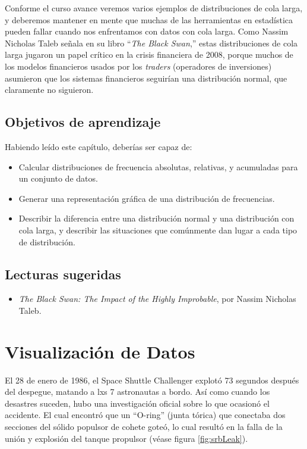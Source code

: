 \documentclass[
  12pt,
]{book}
\providecommand{\tightlist}{%
  \setlength{\itemsep}{0pt}\setlength{\parskip}{0pt}}
\begin{document}
Conforme el curso avance veremos varios ejemplos de distribuciones de cola larga, y deberemos mantener en mente que muchas de las herramientas en estadística pueden fallar cuando nos enfrentamos con datos con cola larga. Como Nassim Nicholas Taleb señala en su libro ``\emph{The Black Swan},'' estas distribuciones de cola larga jugaron un papel crítico en la crisis financiera de 2008, porque muchos de los modelos financieros usados por los \emph{traders} (operadores de inversiones) asumieron que los sistemas financieros seguirían una distribución normal, que claramente no siguieron.

\hypertarget{objetivos-de-aprendizaje}{%
\section{Objetivos de aprendizaje}\label{objetivos-de-aprendizaje}}

Habiendo leído este capítulo, deberías ser capaz de:

\begin{itemize}
\tightlist
\item
  Calcular distribuciones de frecuencia absolutas, relativas, y acumuladas para un conjunto de datos.
\item
  Generar una representación gráfica de una distribución de frecuencias.
\item
  Describir la diferencia entre una distribución normal y una distribución con cola larga, y describir las situaciones que comúnmente dan lugar a cada tipo de distribución.
\end{itemize}

\hypertarget{lecturas-sugeridas}{%
\section{Lecturas sugeridas}\label{lecturas-sugeridas}}

\begin{itemize}
\tightlist
\item
  \emph{The Black Swan: The Impact of the Highly Improbable}, por Nassim Nicholas Taleb.
\end{itemize}

\hypertarget{data-visualization}{%
\chapter{Visualización de Datos}\label{data-visualization}}

El 28 de enero de 1986, el Space Shuttle Challenger explotó 73 segundos después del despegue, matando a lxs 7 astronautas a bordo. Así como cuando los desastres suceden, hubo una investigación oficial sobre lo que ocasionó el accidente. El cual encontró que un ``O-ring'' (junta tórica) que conectaba dos secciones del sólido populsor de cohete goteó, lo cual resultó en la falla de la unión y explosión del tanque propulsor (véase figura \ref{fig:srbLeak}).
\end{document}
